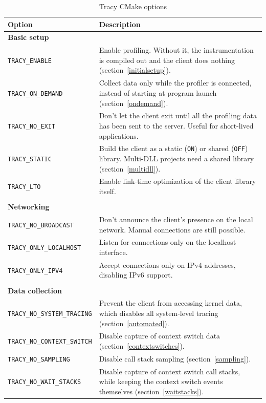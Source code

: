 \documentclass[hidelinks,titlepage,a4paper,twoside]{article}
\begin{document}
\begin{footnotesize}
\begin{longtable}{@{}p{}p{}@{}}
\caption{Tracy CMake options}\label{cmakeoptions} \\
\hline
\textbf{Option} & \textbf{Description} \\ \hline
\endfirsthead
\hline
\endhead
\hline
\endfoot
\hline
\endlastfoot
\textbf{Basic setup} & \\
\texttt{TRACY\_ENABLE} & Enable profiling. Without it, the instrumentation is compiled out and the client does nothing (section~\ref{initialsetup}). \\
\texttt{TRACY\_ON\_DEMAND} & Collect data only while the profiler is connected, instead of starting at program launch (section~\ref{ondemand}). \\
\texttt{TRACY\_NO\_EXIT} & Don't let the client exit until all the profiling data has been sent to the server. Useful for short-lived applications. \\
\texttt{TRACY\_STATIC} & Build the client as a static (\texttt{ON}) or shared (\texttt{OFF}) library. Multi-DLL projects need a shared library (section~\ref{multidll}). \\
\texttt{TRACY\_LTO} & Enable link-time optimization of the client library itself. \\
& \\
\textbf{Networking} & \\
\texttt{TRACY\_NO\_BROADCAST} & Don't announce the client's presence on the local network. Manual connections are still possible. \\
\texttt{TRACY\_ONLY\_LOCALHOST} & Listen for connections only on the localhost interface. \\
\texttt{TRACY\_ONLY\_IPV4} & Accept connections only on IPv4 addresses, disabling IPv6 support. \\
& \\
\textbf{Data collection} & \\
\texttt{TRACY\_NO\_SYSTEM\_TRACING} & Prevent the client from accessing kernel data, which disables all system-level tracing (section~\ref{automated}). \\
\texttt{TRACY\_NO\_CONTEXT\_SWITCH} & Disable capture of context switch data (section~\ref{contextswitches}). \\
\texttt{TRACY\_NO\_SAMPLING} & Disable call stack sampling (section~\ref{sampling}). \\
\texttt{TRACY\_NO\_WAIT\_STACKS} & Disable capture of context switch call stacks, while keeping the context switch events themselves (section~\ref{waitstacks}). \\

\end{longtable}
\end{footnotesize}
\end{document}
